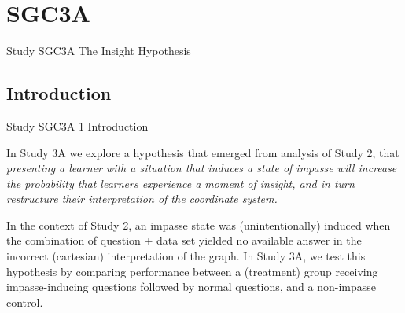 \documentclass[
  letterpaper,
  DIV=11,
  numbers=noendperiod]{scrreprt}
\begin{document}
\part{SGC3A}

Study SGC3A \textbar{} The Insight Hypothesis

\hfill\break

\hypertarget{sec-SGC3A-introduction}{%
\chapter{Introduction}\label{sec-SGC3A-introduction}}

Study SGC3A \textbar{} 1 Introduction

\hfill\break

\newpage

In Study 3A we explore a hypothesis that emerged from analysis of Study
2, that \emph{presenting a learner with a situation that induces a state
of impasse will increase the probability that learners experience a
moment of insight, and in turn restructure their interpretation of the
coordinate system.}

In the context of Study 2, an impasse state was (unintentionally)
induced when the combination of question + data set yielded no available
answer in the incorrect (cartesian) interpretation of the graph. In
Study 3A, we test this hypothesis by comparing performance between a
(treatment) group receiving impasse-inducing questions followed by
normal questions, and a non-impasse control.
\end{document}
